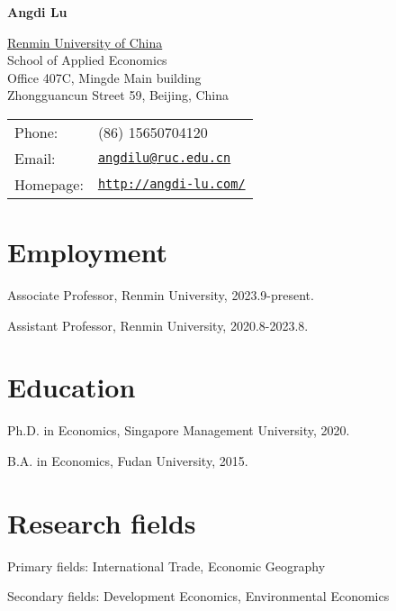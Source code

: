 \documentclass[letterpaper]{article}
\def\name{Angdi Lu}
\renewenvironment{itemize}{
	\begin{list}{}{
			\setlength{\leftmargin}{1.5em}
		}
	}{
	\end{list}
}
\begin{document}
	
	{\huge \textbf{\name}}
	
	
	\vspace{0.25in}
	
	\begin{minipage}{0.5\linewidth}
		\href{http://www.ruc.edu.cn/}{Renmin University of China} \\
		School of Applied Economics \\
 Office	 407C, Mingde Main building \\
	 Zhongguancun Street 59, Beijing, China
	\end{minipage}
	\begin{minipage}{0.45\linewidth}
		\begin{tabular}{ll}
			Phone: & (86) 15650704120 \\
			Email: & \href{mailto:angdilu@ruc.edu.cn}{\tt angdilu@ruc.edu.cn} \\
			Homepage: & \href{http://angdi-lu.com/}{\tt http://angdi-lu.com/} \\
		\end{tabular}
	\end{minipage}
	
	\section*{\textbf{Employment}}
	
	\begin{itemize}
  \item Associate Professor, Renmin University, 2023.9-present.  
		\item Assistant Professor, Renmin University, 2020.8-2023.8.  
	\end{itemize}

\section*{\textbf{Education}}
	\begin{itemize}
	\item Ph.D. in Economics, Singapore Management University, 2020.
	\item B.A. in Economics, Fudan University, 2015.
	\end{itemize}

\section*{\textbf{Research fields}}
\begin{itemize}
	\item Primary fields: International Trade, Economic Geography
	\item Secondary fields: Development Economics, Environmental Economics  
\end{itemize}
\end{document}
